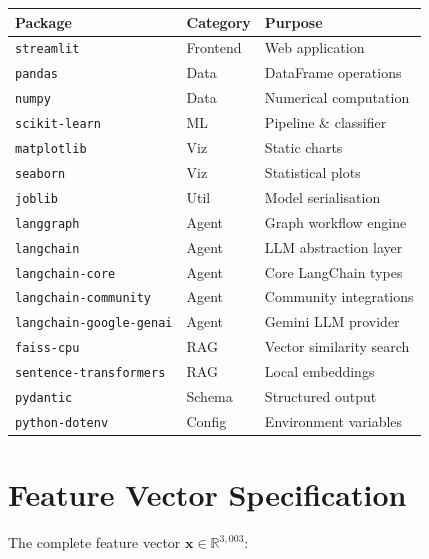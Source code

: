 \documentclass[12pt, a4paper, twoside]{article}
\newcommand{\code}[1]{\texttt{#1}}
\begin{document}
\begin{center}
\renewcommand{\arraystretch}{1.25}
\begin{tabularx}{\textwidth}{l l X}
    \toprule
    \textbf{Package} & \textbf{Category} & \textbf{Purpose} \\
    \midrule
    \code{streamlit}              & Frontend   & Web application \\
    \code{pandas}                 & Data       & DataFrame operations \\
    \code{numpy}                  & Data       & Numerical computation \\
    \code{scikit-learn}           & ML         & Pipeline \& classifier \\
    \code{matplotlib}             & Viz        & Static charts \\
    \code{seaborn}                & Viz        & Statistical plots \\
    \code{joblib}                 & Util       & Model serialisation \\
    \midrule
    \code{langgraph}              & Agent      & Graph workflow engine \\
    \code{langchain}              & Agent      & LLM abstraction layer \\
    \code{langchain-core}         & Agent      & Core LangChain types \\
    \code{langchain-community}    & Agent      & Community integrations \\
    \code{langchain-google-genai} & Agent      & Gemini LLM provider \\
    \code{faiss-cpu}              & RAG        & Vector similarity search \\
    \code{sentence-transformers}  & RAG        & Local embeddings \\
    \code{pydantic}               & Schema     & Structured output \\
    \code{python-dotenv}          & Config     & Environment variables \\
    \bottomrule
\end{tabularx}
\end{center}

\section{Feature Vector Specification}\label{app:features}

The complete feature vector
$\mathbf{x} \in \mathbb{R}^{3{,}003}$:
\end{document}
